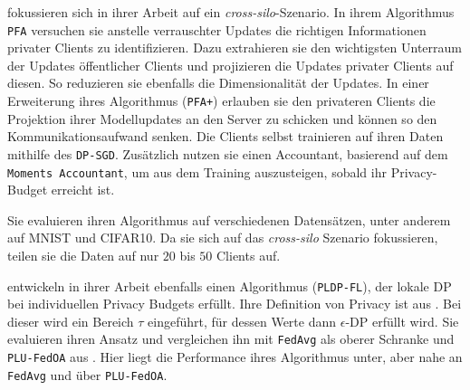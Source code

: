 \textcite{liu:2021} fokussieren sich in ihrer Arbeit auf ein \textit{cross-silo}-Szenario. In ihrem Algorithmus \texttt{PFA} versuchen sie anstelle verrauschter Updates die \glqq{}richtigen\grqq{} Informationen privater Clients zu identifizieren. Dazu extrahieren sie den wichtigsten Unterraum der Updates öffentlicher Clients und projizieren die Updates privater Clients auf diesen. So reduzieren sie ebenfalls die Dimensionalität der Updates. In einer Erweiterung ihres Algorithmus (\texttt{PFA+}) erlauben sie den privateren Clients die Projektion ihrer Modellupdates an den Server zu schicken und können so den Kommunikationsaufwand senken. Die Clients selbst trainieren auf ihren Daten mithilfe des \texttt{DP-SGD}\cite{abadi:2016}. Zusätzlich nutzen sie einen Accountant, basierend auf dem \texttt{Moments Accountant}, um aus dem Training auszusteigen, sobald ihr Privacy-Budget erreicht ist.

Sie evaluieren ihren Algorithmus auf verschiedenen Datensätzen, unter anderem auf MNIST und CIFAR10. Da sie sich auf das \textit{cross-silo} Szenario fokussieren, teilen sie die Daten auf nur $20$ bis $50$ Clients auf.

\textcite{shen:2023} entwickeln in ihrer Arbeit ebenfalls einen Algorithmus (\texttt{PLDP-FL}), der lokale DP bei individuellen Privacy Budgets erfüllt. Ihre Definition von Privacy ist aus \textcite{chen:2016}. Bei dieser wird ein Bereich $\tau$ eingeführt, für dessen Werte dann $\epsilon$-DP erfüllt wird. Sie evaluieren ihren Ansatz und vergleichen ihn mit \texttt{FedAvg} \parencite{mcmahan:2016} als oberer Schranke und \texttt{PLU-FedOA} aus \textcite{yang:2021}. Hier liegt die Performance ihres Algorithmus unter, aber nahe an \texttt{FedAvg} und über \texttt{PLU-FedOA}. 